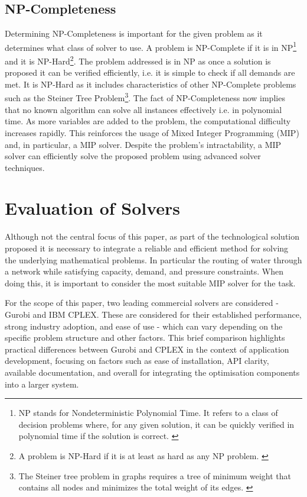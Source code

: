 \subsection{NP-Completeness}
Determining NP-Completeness is important for the given problem as it determines what class of solver to use. A problem is NP-Complete if it is in NP\footnote{NP stands for Nondeterministic Polynomial Time. It refers to a class of decision problems where, for any given solution, it can be quickly verified in polynomial time if the solution is correct. \citep{computationalcomplexity}} and it is NP-Hard\footnote{A problem is NP-Hard if it is at least as hard as any NP problem. \citep{computationalcomplexity}}. The problem addressed is in NP as once a solution is proposed it can be verified efficiently, i.e. it is simple to check if all demands are met. It is NP-Hard as it includes characteristics of other NP-Complete problems such as the Steiner Tree Problem\footnote{The Steiner tree problem in graphs requires a tree of minimum weight that contains all nodes and minimizes the total weight of its edges. \citep{Robins2008}}.\newline
The fact of NP-Completeness now implies that no known algorithm can solve all instances effectively i.e. in polynomial time. As more variables are added to the problem, the computational difficulty increases rapidly. This reinforces the usage of Mixed Integer Programming (MIP) and, in particular, a MIP solver. Despite the problem's intractability, a MIP solver can efficiently solve the proposed problem using advanced solver techniques.

\section{Evaluation of Solvers}\label{evaluationofsolvers}
Although not the central focus of this paper, as part of the technological solution proposed it is necessary to integrate a reliable and efficient method for solving the underlying mathematical problems. In particular the routing of water through a network while satisfying capacity, demand, and pressure constraints. When doing this, it is important to consider the most suitable MIP solver for the task.\newline

For the scope of this paper, two leading commercial solvers are considered - Gurobi and IBM CPLEX. These are considered for their established performance, strong industry adoption, and ease of use - which can vary depending on the specific problem structure and other factors.\newline
This brief comparison highlights practical differences between Gurobi and CPLEX in the context of application development, focusing on factors such as ease of installation, API clarity, available documentation, and overall for integrating the optimisation components into a larger system.

